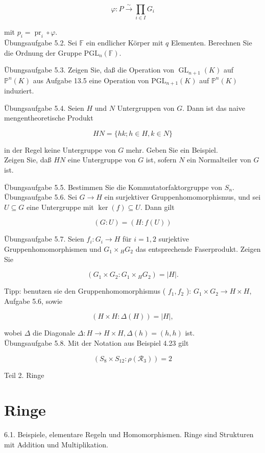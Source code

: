 \documentclass[10pt, letterpaper]{article}
\begin{document}
$$
\varphi: P \xrightarrow{\sim} \prod_{i \in I} G_{i}
$$

mit $p_{i}=\operatorname{pr}_{i} \circ \varphi$.\\
Übungsaufgabe 5.2. Sei $\mathbb{F}$ ein endlicher Körper mit $q$ Elementen. Berechnen Sie die Ordnung der Gruppe $\mathrm{PGL}_{n}(\mathbb{F})$.

Übungsaufgabe 5.3. Zeigen Sie, daß die Operation von $\operatorname{GL}_{n+1}(K)$ auf $\mathbb{P}^{n}(K)$ aus Aufgabe 13.5 eine Operation von $\mathrm{PGL}_{n+1}(K)$ auf $\mathbb{P}^{n}(K)$ induziert.

Übungsaufgabe 5.4. Seien $H$ und $N$ Untergruppen von $G$. Dann ist das naive mengentheoretische Produkt

$$
H N=\{h k ; h \in H, k \in N\}
$$

in der Regel keine Untergruppe von $G$ mehr. Geben Sie ein Beispiel.\\
Zeigen Sie, daß $H N$ eine Untergruppe von $G$ ist, sofern $N$ ein Normalteiler von $G$ ist.

Übungsaufgabe 5.5. Bestimmen Sie die Kommutatorfaktorgruppe von $S_{n}$.\\
Übungsaufgabe 5.6. Sei $G \rightarrow H$ ein surjektiver Gruppenhomomorphismus, und sei $U \subseteq G$ eine Untergruppe mit $\operatorname{ker}(f) \subseteq U$. Dann gilt

$$
(G: U)=(H: f(U))
$$

Übungsaufgabe 5.7. Seien $f_{i}: G_{i} \rightarrow H$ für $i=1,2$ surjektive Gruppenhomomorphismen und $G_{1} \times{ }_{H} G_{2}$ das entsprechende Faserprodukt. Zeigen Sie

$$
\left(G_{1} \times G_{2}: G_{1} \times{ }_{H} G_{2}\right)=|H| .
$$

Tipp: benutzen sie den Gruppenhomomorphismus ( $f_{1}, f_{2}$ ): $G_{1} \times G_{2} \rightarrow H \times H$, Aufgabe 5.6, sowie

$$
(H \times H: \Delta(H))=|H|,
$$

wobei $\Delta$ die Diagonale $\Delta: H \rightarrow H \times H, \Delta(h)=(h, h)$ ist.\\
Übungsaufgabe 5.8. Mit der Notation aus Beispiel 4.23 gilt

$$
\left(S_{8} \times S_{12}: \rho\left(\mathscr{R}_{3}\right)\right)=2
$$

Teil 2. Ringe

\section*{Ringe}
6.1. Beispiele, elementare Regeln und Homomorphismen. Ringe sind Strukturen mit Addition und Multiplikation.
\end{document}
